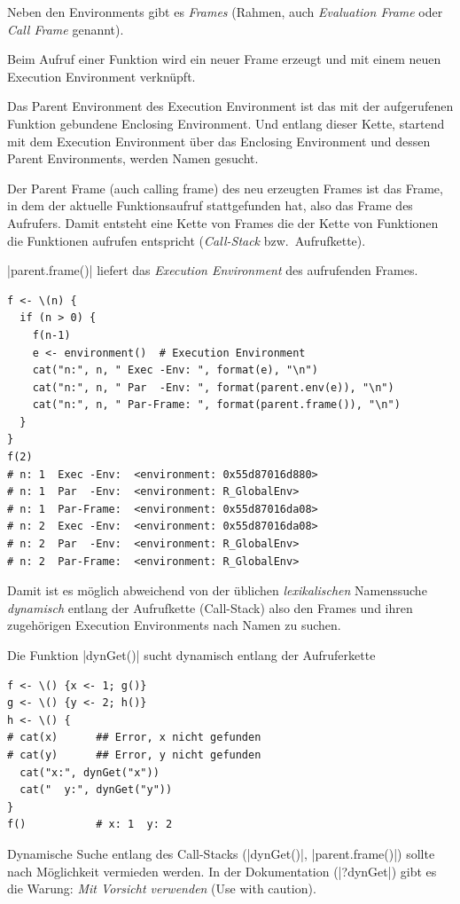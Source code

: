 \documentclass[10pt,twocolumn]{scrartcl}
\renewcommand{\lstinline}{\mycoloredinline}
\begin{document}
Neben den Environments gibt es \emph{Frames} (Rahmen, auch \emph{Evaluation Frame} oder \emph{Call Frame} genannt).

Beim Aufruf einer Funktion wird ein neuer Frame erzeugt und mit einem neuen Execution Environment verknüpft.

Das Parent Environment des Execution Environment ist das mit der aufgerufenen Funktion gebundene Enclosing Environment. Und entlang dieser Kette, startend mit dem Execution Environment über das Enclosing Environment und dessen Parent Environments, werden Namen gesucht.

Der Parent Frame (auch calling frame) des neu erzeugten Frames ist das Frame, in dem der aktuelle Funktionsaufruf stattgefunden hat, also das Frame des Aufrufers.  Damit entsteht eine Kette von Frames die der Kette von Funktionen die Funktionen aufrufen entspricht (\emph{Call-Stack} bzw.\ Aufrufkette).

\lstinline|parent.frame()| liefert das \emph{Execution Environment} des aufrufenden Frames.

\begin{lstlisting}
f <- \(n) {
  if (n > 0) {
    f(n-1)
    e <- environment()  # Execution Environment
    cat("n:", n, " Exec -Env: ", format(e), "\n")
    cat("n:", n, " Par  -Env: ", format(parent.env(e)), "\n")
    cat("n:", n, " Par-Frame: ", format(parent.frame()), "\n")
  }
}
f(2)
# n: 1  Exec -Env:  <environment: 0x55d87016d880> 
# n: 1  Par  -Env:  <environment: R_GlobalEnv> 
# n: 1  Par-Frame:  <environment: 0x55d87016da08> 
# n: 2  Exec -Env:  <environment: 0x55d87016da08> 
# n: 2  Par  -Env:  <environment: R_GlobalEnv> 
# n: 2  Par-Frame:  <environment: R_GlobalEnv> 
\end{lstlisting}

Damit ist es möglich abweichend von der üblichen \emph{lexikalischen}
Namenssuche \emph{dynamisch} entlang der Aufrufkette (Call-Stack)
also den Frames und ihren zugehörigen Execution Environments nach Namen
zu suchen.

Die Funktion \lstinline|dynGet()| sucht dynamisch entlang der Aufruferkette

\begin{lstlisting}
f <- \() {x <- 1; g()}
g <- \() {y <- 2; h()}
h <- \() {
# cat(x)      ## Error, x nicht gefunden
# cat(y)      ## Error, y nicht gefunden
  cat("x:", dynGet("x"))
  cat("  y:", dynGet("y"))
}
f()           # x: 1  y: 2
\end{lstlisting}

Dynamische Suche entlang des Call-Stacks (\lstinline|dynGet()|, \lstinline|parent.frame()|) sollte nach Möglichkeit vermieden werden.
In der Dokumentation (\lstinline|?dynGet|) gibt es die Warung: \emph{Mit Vorsicht verwenden} (Use with caution).
\end{document}
